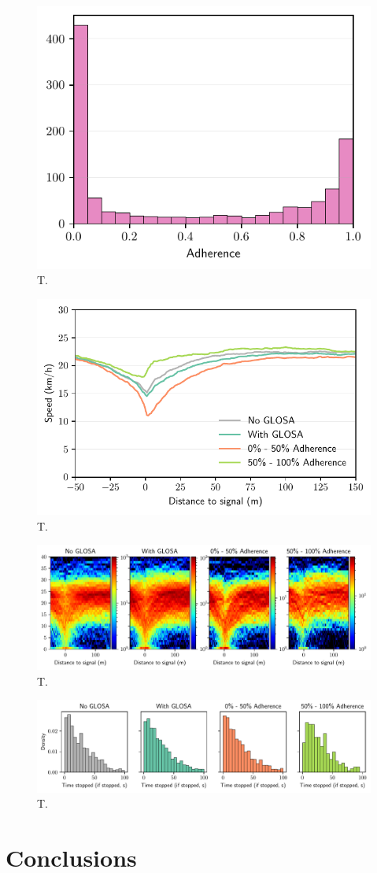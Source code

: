 \begin{figure}[t]
\caption{T.}\label{fig:}
\includegraphics[width=0.6\linewidth]{images/impacts-adherence.pdf}
\end{figure}

\begin{figure}[t]
\caption{T.}\label{fig:}
\includegraphics[width=0.6\linewidth]{images/impacts-approach-speed.pdf}
\end{figure}

\begin{figure}[t]
\caption{T.}\label{fig:}
\includegraphics[width=\linewidth]{images/impacts-approach-speed-heatmap.pdf}
\end{figure}

\begin{figure}[t]
\caption{T.}\label{fig:}
\includegraphics[width=\linewidth]{images/impacts-stop-time-adherence.pdf}
\end{figure}

\section{Conclusions}

